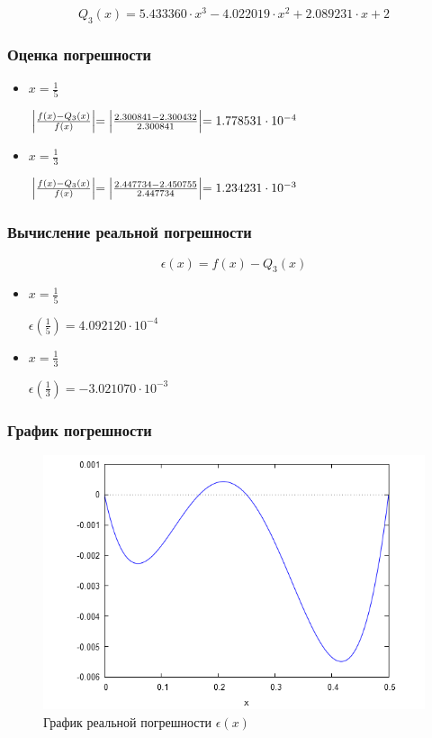 \begin{displaymath}
Q_3(x) = 5.433360 \cdot x^3 - 4.022019 \cdot x^2 + 2.089231 \cdot x+2
\end{displaymath}

\subsubsection{Оценка погрешности}

\begin{itemize}

\item $x = \frac{1}{5}$

$\Bigl | \frac{f(x) - Q_3(x)}{f(x)} \Bigl | = \Bigl | \frac{2.300841 - 2.300432}{2.300841} \Bigl | = 1.778531 \cdot 10^{-4}$

\item $x = \frac{1}{3}$

$\Bigl | \frac{f(x) - Q_3(x)}{f(x)} \Bigl | = \Bigl | \frac{2.447734 - 2.450755}{2.447734} \Bigl | = 1.234231 \cdot 10^{-3}$

\end{itemize}

\subsubsection{Вычисление реальной погрешности}

\begin{displaymath}
\epsilon(x) = f(x) - Q_3(x)
\end{displaymath}

\begin{itemize}

\item $x = \frac{1}{5}$

$\epsilon(\frac{1}{5}) = 4.092120 \cdot 10^{-4}$

\item $x = \frac{1}{3}$

$\epsilon(\frac{1}{3}) = -3.021070 \cdot 10^{-3}$

\end{itemize}

\subsubsection{График погрешности}

\begin{figure}[H]
	\begin{center}
		\includegraphics[width=15cm]{image.png}
		\caption{График реальной погрешности $\epsilon(x)$} 
		\label{pic:1}
	\end{center}
\end{figure}


